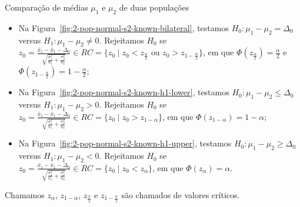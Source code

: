 \documentclass[9pt]{beamer}
\begin{document}
\begin{frame}{Comparação de médias $\mu_1$ e $\mu_2$ de duas populações}

\begin{itemize}
	\item Na Figura~\ref{fig:2-pop-normal-s2-known-bilateral}, testamos $H_0: \mu_1 - \mu_2 = \Delta_0$ versus $H_1: \mu_1 - \mu_2 \neq 0$. Rejeitamos $H_0$ se $z_0 = \frac{\bar{x}_1 - \bar{x}_1 - \Delta_0}{ \sqrt{ \frac{\sigma_1^2}{n_1} + \frac{\sigma_2^2}{n_2} } } \in \allowbreak RC=\{z_0 \mid z_0 < z_\frac{\alpha}{2} \mbox{ ou } z_0 > z_{1-\frac{\alpha}{2}} \}$, em que $\Phi\left( z_\frac{\alpha}{2} \right) = \frac{\alpha}{2}$ e $\Phi\left( z_{1-\frac{\alpha}{2}} \right) = 1- \frac{\alpha}{2}$;
	\vfill
	
	\item Na Figura~\ref{fig:2-pop-normal-s2-known-h1-lower}, testamos $H_0: \mu_1 - \mu_2 \leq \Delta_0 $ versus $H_1: \mu_1 - \mu_2 > 0$. Rejeitamos $H_0$ se $z_0 = \frac{\bar{x}_1-\bar{x}_1  - \Delta_0}{\sqrt{ \frac{\sigma_1^2}{n_1} + \frac{\sigma_2^2}{n_2} }} \in \allowbreak RC=\{z_0 \mid z_0 > z_{1-\alpha}  \}$, em que $\Phi\left( z_{1-\alpha} \right) =1- \alpha$;
	\vfill
	
	\item Na Figura~\ref{fig:2-pop-normal-s2-known-h1-upper}, testamos $H_0: \mu_1 - \mu_2 \geq \Delta_0$ versus $H_1: \mu_1 - \mu_2  < 0$. Rejeitamos $H_0$ se $z_0 = \frac{\bar{x}_1-\bar{x}_1  - \Delta_0}{\sqrt{ \frac{\sigma_1^2}{n_1} + \frac{\sigma_2^2}{n_2} }} \in \allowbreak RC=\{z_0 \mid z_0 < z_{\alpha}  \}$, em que $\Phi\left( z_{\alpha} \right) = \alpha$.
\end{itemize}
Chamamos $z_\alpha$, $z_{1-\alpha}$, $z_\frac{\alpha}{2}$ e $z_{1-\frac{\alpha}{2}}$ são chamados de valores críticos.

\end{frame}
\end{document}
